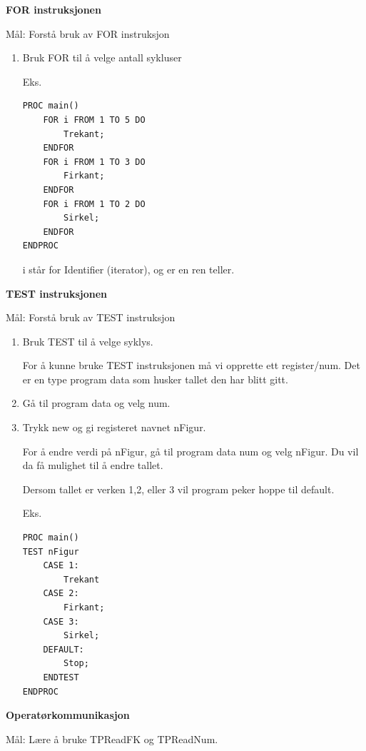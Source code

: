 \textbf{FOR instruksjonen}

Mål: Forstå bruk av FOR instruksjon
\begin{enumerate}
\item Bruk FOR til å velge antall sykluser

Eks.

\begin{lstlisting}[basicstyle={\sffamily}]
PROC main()
	FOR i FROM 1 TO 5 DO
		Trekant;
	ENDFOR
	FOR i FROM 1 TO 3 DO
		Firkant;
	ENDFOR
	FOR i FROM 1 TO 2 DO
		Sirkel;
	ENDFOR   
ENDPROC
\end{lstlisting}

i står for Identifier (iterator), og er en ren teller.
\end{enumerate}

\textbf{TEST instruksjonen}

Mål: Forstå bruk av TEST instruksjon
\begin{enumerate}
\item Bruk TEST til å velge syklys.

For å kunne bruke TEST instruksjonen må vi opprette ett register/num.
Det er en type program data som husker tallet den har blitt gitt.
\item Gå til program data og velg num.
\item Trykk new og gi registeret navnet nFigur. 

For å endre verdi på nFigur, gå til program data num og velg nFigur.
Du vil da få mulighet til å endre tallet. 

Dersom tallet er verken 1,2, eller 3 vil program peker hoppe til default.

Eks.

\begin{lstlisting}[basicstyle={\sffamily}]
PROC main()
TEST nFigur   
	CASE 1:
		Trekant
	CASE 2:
		Firkant;
	CASE 3:
		Sirkel;
	DEFAULT:
		Stop;
	ENDTEST    
ENDPROC
\end{lstlisting}

\end{enumerate}


\textbf{Operatørkommunikasjon}

Mål: Lære å bruke TPReadFK og TPReadNum.

